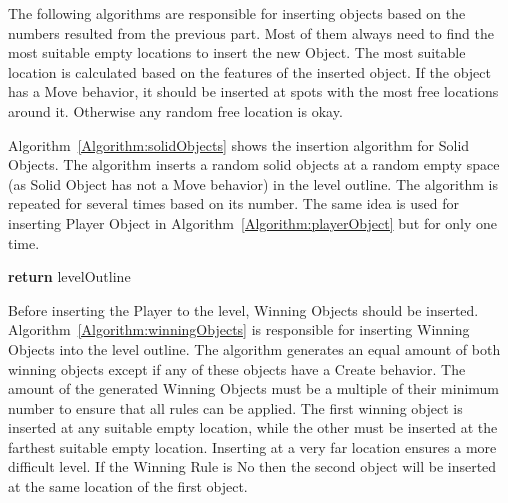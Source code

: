 \documentclass[letterpaper]{article}
\newcommand{\algref}[1]{Algorithm~\ref{Algorithm:#1}}
\begin{document}
The following algorithms are responsible for inserting objects based on the numbers resulted from the previous part. Most of them always need to find the most suitable empty locations to insert the new Object. The most suitable location is calculated based on the features of the inserted object. If the object has a Move behavior, it should be inserted at spots with the most free locations around it. Otherwise any random free location is okay.\\\par

\algref{solidObjects} shows the insertion algorithm for Solid Objects. The algorithm inserts a random solid objects at a random empty space (as Solid Object has not a Move behavior) in the level outline. The algorithm is repeated for several times based on its number. The same idea is used for inserting Player Object in \algref{playerObject} but for only one time.\\

\begin{algorithm}[ht]
	\BlankLine
	\BlankLine
	\textbf{return} levelOutline\;
	\caption{Solid Objects Insertion Algorithm}
	\label{Algorithm:solidObjects}
\end{algorithm}

Before inserting the Player to the level, Winning Objects should be inserted. \algref{winningObjects} is responsible for inserting Winning Objects into the level outline. The algorithm generates an equal amount of both winning objects except if any of these objects have a Create behavior. The amount of the generated Winning Objects must be a multiple of their minimum number to ensure that all rules can be applied. The first winning object is inserted at any suitable empty location, while the other must be inserted at the farthest suitable empty location. Inserting at a very far location ensures a more difficult level. If the Winning Rule is No then the second object will be inserted at the same location of the first object.\\
\end{document}
